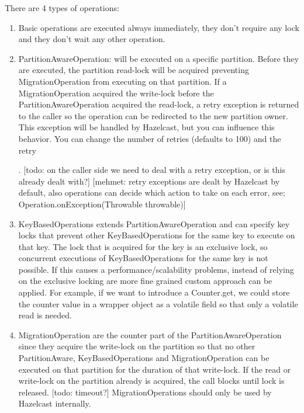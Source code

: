 There are 4 types of operations:
\begin{enumerate}
\item Basic operations are executed always immediately, they don't require any lock and they don't wait any other operation.
\item PartitionAwareOperation: will be executed on a specific partition. Before they are executed, the partition read-lock will be acquired preventing MigrationOperation from executing on that partition. If a MigrationOperation acquired the write-lock before the PartitionAwareOperation acquired the read-lock, a retry exception is returned to the caller so the operation can be redirected to the new partition owner. This exception will be handled by Hazelcast, but you can influence this behavior. You can change the number of retries (defaults to 100) and the retry 

. [todo: on the caller side we need to deal with a retry exception, or is this already dealt with?] [mehmet: retry exceptions are dealt by Hazelcast by default, also operations can decide which action to take on each error, see; Operation.onException(Throwable throwable)]
\item KeyBasedOperations extends PartitionAwareOperation and can specify key locks that prevent other KeyBasedOperations for the same key to execute on that key. The lock that is acquired for the key is an exclusive lock, so concurrent executions of  KeyBasedOperations for the same key is not possible. If this causes a performance/scalability problems, instead of relying on the exclusive locking are more fine grained custom approach can be applied. For example, if we want to introduce a Counter.get, we could store the counter value in a wrapper object as a volatile field so that only a volatile read is needed.
\item MigrationOperation are the counter part of the PartitionAwareOperation since they acquire the write-lock on the partition so that no other PartitionAware, KeyBasedOperations and MigrationOperation can be executed on that partition for the duration of that write-lock. If the read or write-lock on the partition already is acquired, the call blocks until lock is released. [todo: timeout?] MigrationOperations should only be used by Hazelcast internally.
\end{enumerate}

